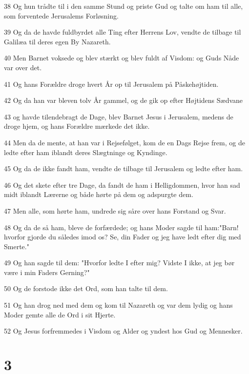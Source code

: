 \par 38 Og hun trådte til i den samme Stund og priste Gud og talte om ham til alle, som forventede Jerusalems Forløsning.
\par 39 Og da de havde fuldbyrdet alle Ting efter Herrens Lov, vendte de tilbage til Galilæa til deres egen By Nazareth.
\par 40 Men Barnet voksede og blev stærkt og blev fuldt af Visdom: og Guds Nåde var over det.
\par 41 Og hans Forældre droge hvert År op til Jerusalem på Påskehøjtiden.
\par 42 Og da han var bleven tolv År gammel, og de gik op efter Højtidens Sædvane
\par 43 og havde tilendebragt de Dage, blev Barnet Jesus i Jerusalem, medens de droge hjem, og hans Forældre mærkede det ikke.
\par 44 Men da de mente, at han var i Rejsefølget, kom de en Dags Rejse frem, og de ledte efter ham iblandt deres Slægtninge og Kyndinge.
\par 45 Og da de ikke fandt ham, vendte de tilbage til Jerusalem og ledte efter ham.
\par 46 Og det skete efter tre Dage, da fandt de ham i Helligdommen, hvor han sad midt iblandt Lærerne og både hørte på dem og adspurgte dem.
\par 47 Men alle, som hørte ham, undrede sig såre over hans Forstand og Svar.
\par 48 Og da de så ham, bleve de forfærdede; og hans Moder sagde til ham:"Barn! hvorfor gjorde du således imod os? Se, din Fader og jeg have ledt efter dig med Smerte."
\par 49 Og han sagde til dem: "Hvorfor ledte I efter mig? Vidste I ikke, at jeg bør være i min Faders Gerning?"
\par 50 Og de forstode ikke det Ord, som han talte til dem.
\par 51 Og han drog ned med dem og kom til Nazareth og var dem lydig og hans Moder gemte alle de Ord i sit Hjerte.
\par 52 Og Jesus forfremmedes i Visdom og Alder og yndest hos Gud og Mennesker.

\chapter{3}


